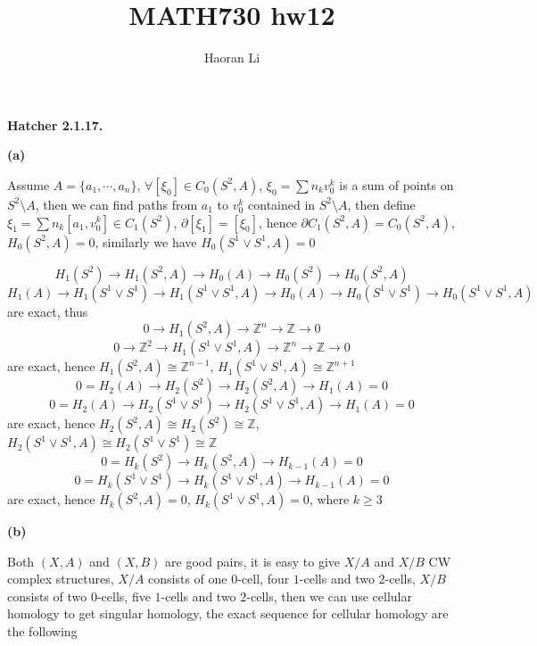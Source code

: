 \documentclass[12pt]{article}
\title{MATH730 hw12}
\author{Haoran Li}
\date{}
\begin{document}
\maketitle
\textbf{Hatcher 2.1.17.} \par
\textbf{(a)} \par
Assume $A=\{a_1,\cdots,a_n\}$, $\forall [\xi_0]\in C_0(S^2,A)$, $\xi_0=\sum n_kv_0^k$ is a sum of points on $S^2\setminus A$, then we can find paths from $a_1$ to $v_0^k$ contained in $S^2\setminus A$, then define $\xi_1=\sum n_k[a_1,v_0^k]\in C_1(S^2)$, $\partial[\xi_1]=[\xi_0]$, hence $\partial C_1(S^2,A)=C_0(S^2,A)$, $H_0(S^2,A)=0$, similarly we have $H_0(S^1\vee S^1,A)=0$ \par
\[H_1(S^2)\rightarrow H_1(S^2,A)\rightarrow H_0(A)\rightarrow H_0(S^2)\rightarrow H_0(S^2,A)\]
\[H_1(A)\rightarrow H_1(S^1\vee S^1)\rightarrow H_1(S^1\vee S^1,A)\rightarrow H_0(A)\rightarrow H_0(S^1\vee S^1)\rightarrow H_0(S^1\vee S^1,A)\]
are exact, thus
\[0\rightarrow H_1(S^2,A)\rightarrow \mathbb{Z}^n\rightarrow \mathbb{Z}\rightarrow 0\]
\[0\rightarrow \mathbb{Z}^2\rightarrow H_1(S^1\vee S^1,A)\rightarrow \mathbb{Z}^n\rightarrow \mathbb{Z}\rightarrow 0\]
are exact, hence $H_1(S^2,A)\cong\mathbb{Z}^{n-1}$, $H_1(S^1\vee S^1,A)\cong\mathbb{Z}^{n+1}$
\[0=H_2(A)\rightarrow H_2(S^2)\rightarrow H_2(S^2,A)\rightarrow H_1(A)=0\]
\[0=H_2(A)\rightarrow H_2(S^1\vee S^1)\rightarrow H_2(S^1\vee S^1,A)\rightarrow H_1(A)=0\]
are exact, hence $H_2(S^2,A)\cong H_2(S^2)\cong\mathbb{Z}$, $H_2(S^1\vee S^1,A)\cong H_2(S^1\vee S^1)\cong\mathbb{Z}$ 
\[0=H_k(S^2)\rightarrow H_k(S^2,A)\rightarrow H_{k-1}(A)=0\]
\[0=H_k(S^1\vee S^1)\rightarrow H_k(S^1\vee S^1,A)\rightarrow H_{k-1}(A)=0\]
are exact, hence $H_k(S^2,A)=0$, $H_k(S^1\vee S^1,A)=0$, where $k\geq 3$ \par
\textbf{(b)} \par
Both $(X,A)$ and $(X,B)$ are good pairs,  it is easy to give $X/A$ and $X/B$ CW complex structures, $X/A$ consists of one $0$-cell, four $1$-cells and two $2$-cells, $X/B$ consists of two $0$-cells, five $1$-cells and two $2$-cells, then we can use cellular homology to get singular homology, the exact sequence for cellular homology are the following \par
\begin{center}
\end{center}
\par
\end{document}
